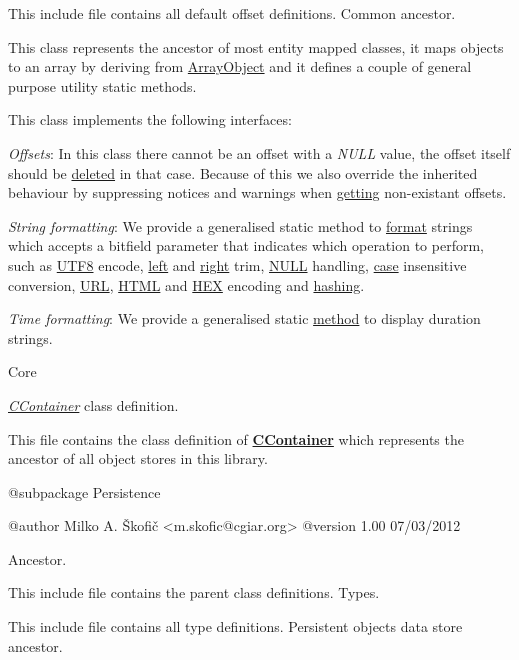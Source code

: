 This include file contains all default offset definitions. Common ancestor.

This class represents the ancestor of most entity mapped classes, it maps objects to an array by deriving from \hyperlink{}{Array\-Object} and it defines a couple of general purpose utility static methods.

This class implements the following interfaces\-:


\begin{DoxyItemize}
\item {\itshape Offsets\/}\-: In this class there cannot be an offset with a {\itshape N\-U\-L\-L\/} value, the offset itself should be \hyperlink{}{deleted} in that case. Because of this we also override the inherited behaviour by suppressing notices and warnings when \hyperlink{}{getting} non-\/existant offsets. 
\item {\itshape String formatting\/}\-: We provide a generalised static method to \hyperlink{}{format} strings which accepts a bitfield parameter that indicates which operation to perform, such as \hyperlink{}{U\-T\-F8} encode, \hyperlink{}{left} and \hyperlink{}{right} trim, \hyperlink{}{N\-U\-L\-L} handling, \hyperlink{}{case} insensitive conversion, \hyperlink{}{U\-R\-L}, \hyperlink{}{H\-T\-M\-L} and \hyperlink{}{H\-E\-X} encoding and \hyperlink{}{hashing}. 
\item {\itshape Time formatting\/}\-: We provide a generalised static \hyperlink{}{method} to display duration strings. 
\end{DoxyItemize}

Core

{\itshape \hyperlink{class_c_container}{C\-Container}\/} class definition.

This file contains the class definition of {\bfseries \hyperlink{class_c_container}{C\-Container}} which represents the ancestor of all object stores in this library.

\begin{DoxyVerb}    @subpackage     Persistence

    @author         Milko A. Škofič <m.skofic@cgiar.org>
    @version        1.00 07/03/2012\end{DoxyVerb}


Ancestor.

This include file contains the parent class definitions. Types.

This include file contains all type definitions. Persistent objects data store ancestor.

